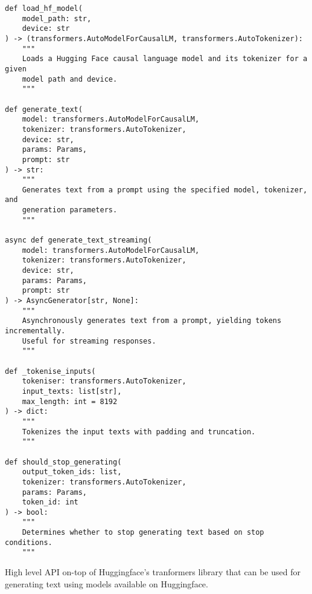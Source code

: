 \begin{listing}[H]
\centering
\renewcommand{\theFancyVerbLine}{\scriptsize\arabic{FancyVerbLine}}
\scriptsize
\begin{verbatim}
def load_hf_model(
    model_path: str,
    device: str
) -> (transformers.AutoModelForCausalLM, transformers.AutoTokenizer):
    """
    Loads a Hugging Face causal language model and its tokenizer for a given
    model path and device.
    """

def generate_text(
    model: transformers.AutoModelForCausalLM,
    tokenizer: transformers.AutoTokenizer,
    device: str,
    params: Params,
    prompt: str
) -> str:
    """
    Generates text from a prompt using the specified model, tokenizer, and
    generation parameters.
    """

async def generate_text_streaming(
    model: transformers.AutoModelForCausalLM,
    tokenizer: transformers.AutoTokenizer,
    device: str,
    params: Params,
    prompt: str
) -> AsyncGenerator[str, None]:
    """
    Asynchronously generates text from a prompt, yielding tokens incrementally.
    Useful for streaming responses.
    """

def _tokenise_inputs(
    tokeniser: transformers.AutoTokenizer,
    input_texts: list[str],
    max_length: int = 8192
) -> dict:
    """
    Tokenizes the input texts with padding and truncation.
    """

def should_stop_generating(
    output_token_ids: list,
    tokenizer: transformers.AutoTokenizer,
    params: Params,
    token_id: int
) -> bool:
    """
    Determines whether to stop generating text based on stop conditions.
    """
\end{verbatim}
\caption{High level API on-top of Huggingface's tranformers library that can be used for generating text using models available on Huggingface.}
\label{fig:python-apis-for-llm}
\end{listing}
